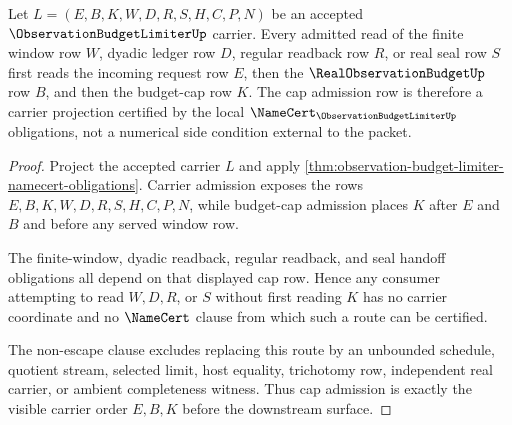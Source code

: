 \begin{theorem}
\label{thm:observation-budget-limiter-cap-admission}
Let $L=(E,B,K,W,D,R,S,H,C,P,N)$ be an accepted $\ObservationBudgetLimiterUp$ carrier. Every admitted read of the finite window row $W$, dyadic ledger row $D$, regular readback row $R$, or real seal row $S$ first reads the incoming request row $E$, then the $\RealObservationBudgetUp$ row $B$, and then the budget-cap row $K$. The cap admission row is therefore a carrier projection certified by the local $\NameCert_{\ObservationBudgetLimiterUp}$ obligations, not a numerical side condition external to the packet.
\end{theorem}
\begin{proof}
Project the accepted carrier $L$ and apply \autoref{thm:observation-budget-limiter-namecert-obligations}. Carrier admission exposes the rows $E,B,K,W,D,R,S,H,C,P,N$, while budget-cap admission places $K$ after $E$ and $B$ and before any served window row.

The finite-window, dyadic readback, regular readback, and seal handoff obligations all depend on that displayed cap row. Hence any consumer attempting to read $W,D,R$, or $S$ without first reading $K$ has no carrier coordinate and no $\NameCert$ clause from which such a route can be certified.

The non-escape clause excludes replacing this route by an unbounded schedule, quotient stream, selected limit, host equality, trichotomy row, independent real carrier, or ambient completeness witness. Thus cap admission is exactly the visible carrier order $E,B,K$ before the downstream surface.
\end{proof}

